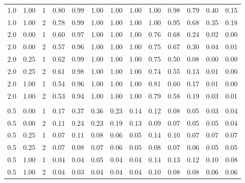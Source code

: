 \begin{table}
\begin{threeparttable}
\begin{tabular}[t]{rrrrrrrrrrrrr}
\hspace{1em}1.0 & 1.00 & 1 & 0.80 & 0.99 & 1.00 & 1.00 & 1.00 & 1.00 & 0.98 & 0.79 & 0.40 & 0.15\\
\hspace{1em}1.0 & 1.00 & 2 & 0.78 & 0.99 & 1.00 & 1.00 & 1.00 & 1.00 & 0.95 & 0.68 & 0.35 & 0.18\\
\hspace{1em}2.0 & 0.00 & 1 & 0.60 & 0.97 & 1.00 & 1.00 & 1.00 & 0.76 & 0.68 & 0.24 & 0.02 & 0.00\\
\hspace{1em}2.0 & 0.00 & 2 & 0.57 & 0.96 & 1.00 & 1.00 & 1.00 & 0.75 & 0.67 & 0.30 & 0.04 & 0.01\\
\hspace{1em}2.0 & 0.25 & 1 & 0.62 & 0.99 & 1.00 & 1.00 & 1.00 & 0.75 & 0.50 & 0.08 & 0.00 & 0.00\\
\hspace{1em}2.0 & 0.25 & 2 & 0.61 & 0.98 & 1.00 & 1.00 & 1.00 & 0.74 & 0.55 & 0.13 & 0.01 & 0.00\\
\hspace{1em}2.0 & 1.00 & 1 & 0.54 & 0.96 & 1.00 & 1.00 & 1.00 & 0.81 & 0.60 & 0.17 & 0.01 & 0.00\\
\hspace{1em}2.0 & 1.00 & 2 & 0.53 & 0.94 & 1.00 & 1.00 & 1.00 & 0.79 & 0.58 & 0.19 & 0.03 & 0.01\\
\addlinespace[0.3em]
\multicolumn{13}{c}{\textbf{Type I}}\\
\hspace{1em}0.5 & 0.00 & 1 & 0.17 & 0.37 & 0.36 & 0.23 & 0.14 & 0.12 & 0.08 & 0.05 & 0.03 & 0.04\\
\hspace{1em}0.5 & 0.00 & 2 & 0.11 & 0.24 & 0.23 & 0.19 & 0.13 & 0.09 & 0.07 & 0.05 & 0.05 & 0.04\\
\hspace{1em}0.5 & 0.25 & 1 & 0.07 & 0.11 & 0.08 & 0.06 & 0.05 & 0.14 & 0.10 & 0.07 & 0.07 & 0.07\\
\hspace{1em}0.5 & 0.25 & 2 & 0.07 & 0.08 & 0.07 & 0.06 & 0.05 & 0.08 & 0.07 & 0.06 & 0.05 & 0.05\\
\hspace{1em}0.5 & 1.00 & 1 & 0.04 & 0.04 & 0.05 & 0.04 & 0.04 & 0.14 & 0.13 & 0.12 & 0.10 & 0.08\\
\hspace{1em}0.5 & 1.00 & 2 & 0.04 & 0.03 & 0.04 & 0.04 & 0.04 & 0.10 & 0.08 & 0.08 & 0.06 & 0.06\\

\end{tabular}
\end{threeparttable}
\end{table}
